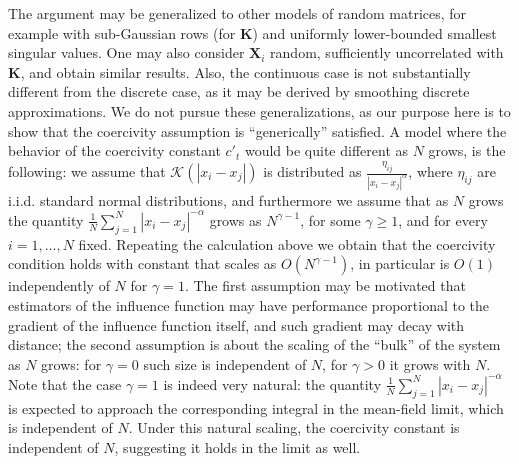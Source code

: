 The argument  may be generalized to other models of random matrices, for example with sub-Gaussian rows (for $\mathbf{K}$) and uniformly lower-bounded smallest singular values. One may also consider $\mathbf{X}_i$ random, sufficiently uncorrelated with $\mathbf{K}$, and obtain similar results. Also, the continuous case is not substantially different from the discrete case, as it may be derived by smoothing discrete approximations. We do not pursue these generalizations, as our purpose here is to show that the coercivity assumption is  ``generically'' satisfied.
A model where the behavior of the coercivity constant $c'_t$ would be quite different as $N$ grows, is the following: we assume that $\mathcal{K}(|x_i-x_j|)$ is distributed as $\frac{\eta_{ij}}{|x_i-x_j|^\alpha}$, where $\eta_{ij}$ are i.i.d. standard normal distributions, and furthermore we assume that as $N$ grows the quantity $\frac1N\sum_{j=1}^N |x_i-x_j|^{-\alpha}$ grows as $N^{\gamma-1}$, for some $\gamma\ge1$, and for every $i=1,\dots,N$ fixed. Repeating the calculation above we obtain that the coercivity condition holds with constant that scales as $O(N^{\gamma-1})$, in particular is $O(1)$ independently of $N$ for $\gamma=1$. The first assumption may be motivated that estimators of the influence function may have performance proportional to the gradient of the influence function itself, and such gradient may decay with distance; the second assumption is about the scaling of the ``bulk'' of the system as $N$ grows: for $\gamma=0$ such size is independent of $N$, for $\gamma>0$ it grows with $N$. Note that the case $\gamma=1$ is indeed very natural: the quantity $\frac1N\sum_{j=1}^N |x_i-x_j|^{-\alpha}$ is expected to approach the corresponding integral in the mean-field limit, which is independent of $N$. Under this natural scaling, the coercivity constant is independent of $N$, suggesting it holds in the limit as well.

